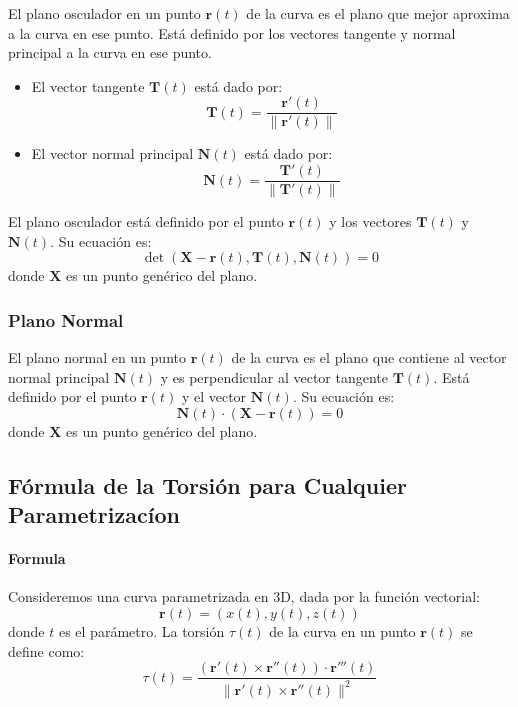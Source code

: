 \documentclass[11pt]{book}
\theoremstyle{definicion}
\theoremstyle{teorema}
\theoremstyle{ejemplo}
\begin{document}
\noindent
El plano osculador en un punto \(\mathbf{r}(t)\) de la curva es el plano que mejor aproxima a la curva en ese punto. Está definido por los vectores tangente y normal principal a la curva en ese punto.
\begin{itemize}
\item El vector tangente \(\mathbf{T}(t)\) está dado por:
\begin{equation*}
\mathbf{T}(t) = \frac{\mathbf{r}'(t)}{\|\mathbf{r}'(t)\|}
\end{equation*}
\item El vector normal principal \(\mathbf{N}(t)\) está dado por:
\begin{equation*}
\mathbf{N}(t) = \frac{\mathbf{T}'(t)}{\|\mathbf{T}'(t)\|}
\end{equation*}
\end{itemize}
El plano osculador está definido por el punto \(\mathbf{r}(t)\) y los vectores \(\mathbf{T}(t)\) y \(\mathbf{N}(t)\). Su ecuación es:
\begin{equation*}
\det(\mathbf{X} - \mathbf{r}(t), \mathbf{T}(t), \mathbf{N}(t)) = 0
\end{equation*}
donde \(\mathbf{X}\) es un punto genérico del plano.

\subsubsection{Plano Normal}

\noindent
El plano normal en un punto \(\mathbf{r}(t)\) de la curva es el plano que contiene al vector normal principal \(\mathbf{N}(t)\) y es perpendicular al vector tangente \(\mathbf{T}(t)\). Está definido por el punto \(\mathbf{r}(t)\) y el vector \(\mathbf{N}(t)\). Su ecuación es:
\begin{equation*}
\mathbf{N}(t) \cdot (\mathbf{X} - \mathbf{r}(t)) = 0
\end{equation*}
donde \(\mathbf{X}\) es un punto genérico del plano.

\subsection{Fórmula de la Torsión para Cualquier Parametrizac\'ion}

\paragraph{Formula}
Consideremos una curva parametrizada en 3D, dada por la función vectorial:
\begin{equation*}
\mathbf{r}(t) = (x(t), y(t), z(t))
\end{equation*}
donde \( t \) es el parámetro.
La torsión \(\tau(t)\) de la curva en un punto \(\mathbf{r}(t)\) se define como:
\begin{equation*}
\tau(t) = \frac{(\mathbf{r}'(t) \times \mathbf{r}''(t)) \cdot \mathbf{r}'''(t)}{\|\mathbf{r}'(t) \times \mathbf{r}''(t)\|^2}
\end{equation*}
\end{document}
